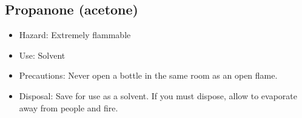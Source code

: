 \subsection{Propanone (acetone)}
\begin{itemize}
\item{Hazard: Extremely flammable}
\item{Use: Solvent}
\item{Precautions: Never open a bottle in the same room as an open flame.}
\item{Disposal: Save for use as a solvent. 
If you must dispose, allow to evaporate away from people and fire.}
\end{itemize}
